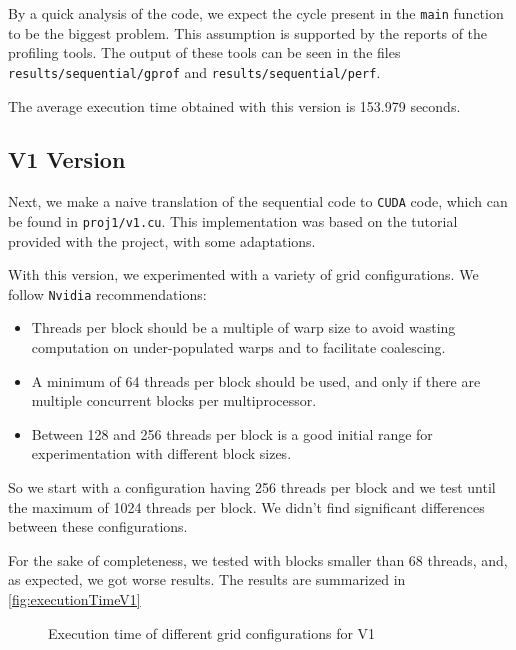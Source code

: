 \documentclass[conference]{IEEEtran}
\begin{document}
By a quick analysis of the code, we expect the cycle present in the \texttt{main} function to be the biggest problem. This assumption is supported by the reports of the profiling tools. The output of these tools can be seen in the files \texttt{results/sequential/gprof} and \texttt{results/sequential/perf}.

The average execution time obtained with this version is 153.979 seconds.

\subsection{V1 Version}
Next, we make a naive translation of the sequential code to \texttt{CUDA} code, which can be found in \texttt{proj1/v1.cu}. This implementation was based on the tutorial provided with the project, with some adaptations.\cite{SolvingHeatEquation}

With this version, we experimented with a variety of grid configurations. We follow \texttt{Nvidia} recommendations\cite{CUDABestPractices}:

\begin{itemize}
  \item Threads per block should be a multiple of warp size to avoid wasting computation on under-populated warps and to facilitate coalescing.
  \item A minimum of 64 threads per block should be used, and only if there are multiple concurrent blocks per multiprocessor.
  \item Between 128 and 256 threads per block is a good initial range for experimentation with different block sizes.
\end{itemize}

So we start with a configuration having 256 threads per block and we test until the maximum of 1024 threads per block. We didn't find significant differences between these configurations.

For the sake of completeness, we tested with blocks smaller than 68 threads, and, as expected, we got worse results. The results are summarized in \autoref{fig:executionTimeV1}


\begin{figure}[ht]
  \centering
  \caption{Execution time of different grid configurations for V1}
  \label{fig:executionTimeV1}
\end{figure}
\end{document}
